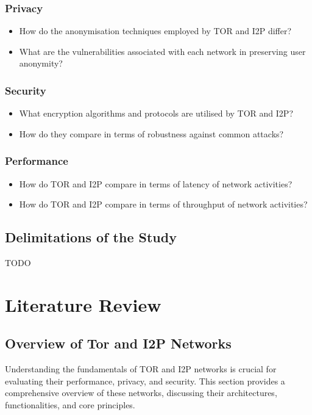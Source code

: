 \documentclass[12pt,conference]{IEEEtran}
\begin{document}
\subsubsection{Privacy}
\begin{itemize}
	\item How do the anonymisation techniques employed by TOR and I2P differ?
	\item What are the vulnerabilities associated with each network in preserving user anonymity?
\end{itemize}
\subsubsection{Security} 
\begin{itemize}
	\item What encryption algorithms and protocols are utilised by TOR and I2P?
	\item How do they compare in terms of robustness against common attacks? 
\end{itemize}
\subsubsection{Performance} 
\begin{itemize}
	\item How do TOR and I2P compare in terms of latency of network activities?
	\item How do TOR and I2P compare in terms of throughput of network activities?
\end{itemize}
\subsection{Delimitations of the Study}
TODO %

\section{Literature Review}
\subsection{Overview of Tor and I2P Networks}
Understanding the fundamentals of TOR and I2P networks is crucial for evaluating their performance, privacy, and security. This section provides a comprehensive overview of these networks, discussing their architectures, functionalities, and core principles.
\end{document}
